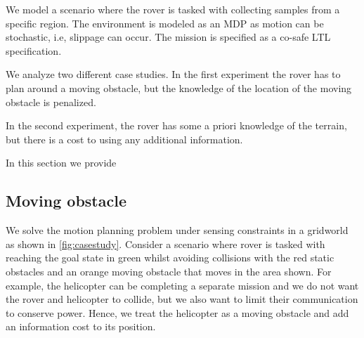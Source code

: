 We model a scenario where the rover is tasked with collecting samples from a specific region. The environment is modeled as an MDP as motion can be stochastic, i.e, slippage can occur. The mission is specified as a co-safe LTL specification. 

We analyze two different case studies. In the first experiment the rover has to plan around a moving obstacle, but the knowledge of the location of the moving obstacle is penalized.

 In the second experiment, the rover has some a priori knowledge of the terrain, but there is a cost to using any additional information. 



In this section we provide 

\subsection{Moving obstacle}
We solve the motion planning problem under sensing constraints in a gridworld as shown in \ref{fig:casestudy}. Consider a scenario where rover is tasked with reaching the goal state in green whilst avoiding collisions with the red static obstacles and an orange moving obstacle that moves in the area shown. For example, the helicopter can be completing a separate mission and we do not want the rover and helicopter to collide, but we also want to limit their communication to conserve power. Hence, we treat the helicopter as a moving obstacle and add an information cost to its position.

